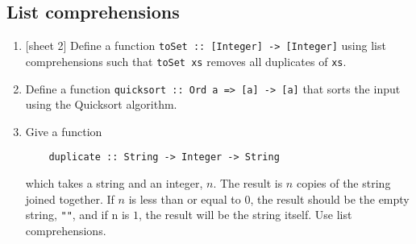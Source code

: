 \documentclass{article}
\begin{document}
\subsection{List comprehensions}
\begin{enumerate}
\item {[sheet 2]} Define a function \verb|toSet :: [Integer] -> [Integer]| using list comprehensions such that \verb|toSet xs| removes all duplicates of \verb|xs|.

\item Define a function \verb|quicksort :: Ord a => [a] -> [a]| that sorts the input using the Quicksort algorithm.

\item \cite[p. 115]{thompson} Give a function
\begin{verbatim}
    duplicate :: String -> Integer -> String
\end{verbatim}
which takes a string and an integer, $n$. The result is $n$ copies of the string joined together. If $n$ is less than or equal to $0$, the result should be the empty string, \verb|""|, and if n is $1$, the result will be the string itself. Use list comprehensions.
\end{enumerate}
\end{document}
